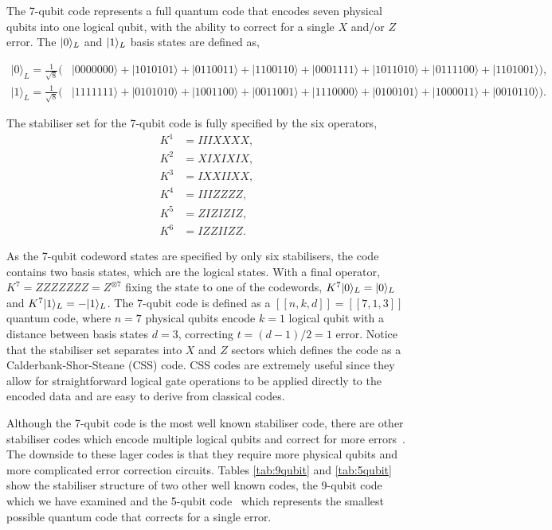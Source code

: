 The 7-qubit code represents a full quantum code that encodes seven physical qubits into one logical qubit, with the ability to correct for a single $X$ and/or $Z$ error. The $|0\rangle_L$ and $|1\rangle_L$ basis states are defined as,
\begin{widetext}
\begin{align}
|0\rangle_L = \frac{1}{\sqrt{8}}(&|0000000\rangle + |1010101\rangle + |0110011\rangle + |1100110\rangle + 
|0001111\rangle + |1011010\rangle + |0111100\rangle + |1101001\rangle),\nonumber\\
|1\rangle_L = \frac{1}{\sqrt{8}}(&|1111111\rangle + |0101010\rangle + |1001100\rangle + |0011001\rangle + 
|1110000\rangle + |0100101\rangle + |1000011\rangle + |0010110\rangle).
\label{eq:log}
\end{align}
\end{widetext}
The stabiliser set for the 7-qubit code is fully specified by the six operators,
\begin{align}\label{eq:stab7}
K^1 &= IIIXXXX, \nonumber\\
K^2 &= XIXIXIX, \nonumber\\ 
K^3 &= IXXIIXX, \nonumber\\
K^4 &= IIIZZZZ, \nonumber\\
K^5 &= ZIZIZIZ, \nonumber\\
K^6 &= IZZIIZZ.
\end{align}

As the 7-qubit codeword states are specified by only six stabilisers, the code contains two basis states, which are the logical states.  With a final operator, $K^7 = ZZZZZZZ=Z^{\otimes 7}$ fixing the state to one of the codewords, $K^7|0\rangle_L = |0\rangle_L$ and $K^7|1\rangle_L = -|1\rangle_L$. The 7-qubit code is defined as a $[[n,k,d]] = [[7,1,3]]$ quantum code, where $n=7$ physical qubits encode $k=1$ logical qubit with a distance between basis states $d=3$, correcting $t = (d-1)/2 = 1$ error.  Notice that the stabiliser set separates into $X$ and $Z$ sectors which defines the code as a Calderbank-Shor-Steane (CSS) code. CSS codes are extremely useful since they allow for straightforward logical gate operations to be applied directly to the encoded data and are easy to derive from classical codes.

Although the 7-qubit code is the most well known stabiliser code, there are other stabiliser codes which encode multiple logical qubits and correct for more errors~\cite{bib:G97+}. The downside to these lager codes is that they require more physical qubits and more complicated error correction circuits. Tables \ref{tab:9qubit} and \ref{tab:5qubit} show the stabiliser structure of two other well known codes, the 9-qubit code \cite{bib:S95} which we have examined and the 5-qubit code~\cite{bib:LMPZ96} which represents the smallest possible quantum code that corrects for a single error.  

